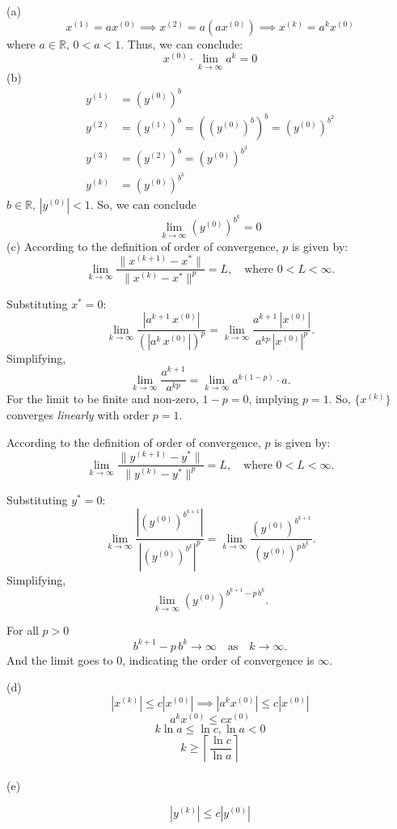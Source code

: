 \documentclass[12pt]{article}
\begin{document}
(a)
\[
x^{(1)} = ax^{(0)} \implies x^{(2)} = a(ax^{(0)}) \implies x^{(k)} = a^k x^{(0)}
\]
where \( a \in \mathbb{R}, \, 0 < a < 1 \). Thus, we can conclude:
\[
x^{(0)} \cdot \lim_{k \to \infty} a^k = 0
\]
(b)
\begin{align*}
  y^{(1)} &= (y^{(0)})^b \\
  y^{(2)} &= (y^{(1)})^b = ((y^{(0)})^b)^b = (y^{(0)})^{b^2} \\
  y^{(3)} &= (y^{(2)})^b = (y^{(0)})^{b^3} \\
  y^{(k)} &= (y^{(0)})^{b^k}
\end{align*}
\( b \in \mathbb{R}, \, \left| y^{(0)} \right| < 1 \). So, we can conclude
\[
\lim_{k \to \infty} (y^{(0)})^{b^k}= 0
\]
(c) 
According to the definition of order of convergence, \( p \) is given by:
\[
\lim_{k \to \infty} \frac{\| x^{(k+1)} - x^* \|}{\| x^{(k)} - x^* \|^p} = L, \quad \text{where } 0 < L < \infty.
\]

Substituting \( x^* = 0 \):
\[
\lim_{k \to \infty} \frac{|a^{k+1} \, x^{(0)}|}{\left( |a^k \, x^{(0)}| \right)^p} = \lim_{k \to \infty} \frac{a^{k+1} \, |x^{(0)}|}{a^{kp} \, |x^{(0)}|^p}.
\]
Simplifying,
\[
\lim_{k \to \infty} \frac{a^{k+1}}{a^{kp}} = \lim_{k \to \infty} a^{k(1-p)} \cdot a.
\]
For the limit to be finite and non-zero, \( 1 - p = 0 \), implying \( p = 1 \). So, \( \{x^{(k)}\} \) converges \textit{linearly} with order \( p = 1 \).

According to the definition of order of convergence, \( p \) is given by:
\[
\lim_{k \to \infty} \frac{\| y^{(k+1)} - y^* \|}{\| y^{(k)} - y^* \|^p} = L, \quad \text{where } 0 < L < \infty.
\]

Substituting \( y^* = 0 \):
\[
\lim_{k \to \infty} \frac{\left| \left(y^{(0)}\right)^{b^{k+1}} \right|}{\left| \left(y^{(0)}\right)^{b^k} \right|^p} = \lim_{k \to \infty} \frac{\left(y^{(0)}\right)^{b^{k+1}}}{\left(y^{(0)}\right)^{p \, b^k}}.
\]
Simplifying,
\[
\lim_{k \to \infty} \left(y^{(0)}\right)^{b^{k+1} - p \, b^k}.
\]

For all $p > 0$
\[
b^{k+1} - p \, b^k \to \infty \quad \text{as} \quad k \to \infty.
\]
And the limit goes to 0, indicating the order of convergence is $\infty$. 

(d)
\[
|x^{(k)}| \leq c |x^{(0)}| \implies |a^k x^{(0)}| \leq c |x^{(0)}|
\]
\[
a^k x^{(0)} \leq c x^{(0)}
\]
\[
k \ln a \leq \ln c, \ln a < 0
\]
\[
k \geq \left\lceil \frac{\ln c}{\ln a} \right\rceil
\]\\
(e)

\[
|y^{(k)}| \leq c |y^{(0)}|
\]
\end{document}
